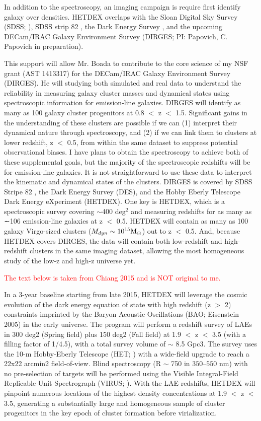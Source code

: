 \documentclass[apj, revtex4]{emulateapj}
\newcommand{\editorial}[1]{\textcolor{red}{#1}}
\begin{document}
In addition to the spectroscopy, an imaging campaign is require first identify galaxy over densities. HETDEX overlaps with the Sloan Digital Sky Survey (SDSS; \citealt{Blanton2001a}), SDSS strip 82 \citep{Annis2014}, the Dark Energy Survey \citep{DES2005}, and the upcoming DECam/IRAC Galaxy Environment Survey (DIRGES; PI: Papovich, C. Papovich \etal in preparation).

This support will allow Mr. Boada to contribute to the core science of my NSF grant (AST 1413317) for the DECam/IRAC Galaxy Environment Survey (DIRGES). He will studying both simulated and real data to understand the reliability in measuring galaxy cluster masses and dynamical states using spectroscopic information for emission-line galaxies. DIRGES will identify as many as 100 galaxy cluster progenitors at 0.8 $<$ z $<$ 1.5. Significant gains in the understanding of these clusters are possible if we can (1) interpret their dynamical nature through spectroscopy, and (2) if we can link them to clusters at lower redshift, z $<$ 0.5, from within the same dataset to suppress potential observational biases. I have plans to obtain the spectroscopy to achieve both of these supplemental goals, but the majority of the spectroscopic redshifts will be for emission-line galaxies. It is not straightforward to use these data to interpret the kinematic and dynamical states of the clusters. DIRGES is covered by SDSS Stripe 82 \citep{Annis2014}, the Dark Energy Survey (DES), and the Hobby Eberly Telescope Dark Energy eXperiment (HETDEX). One key is HETDEX, which is a spectroscopic survey covering $\sim$400 deg$^2$ and measuring redshifts for as many as ∼106 emission-line galaxies at z $<$ 0.5. HETDEX will contain as many as 100 galaxy Virgo-sized clusters ($M_{dyn}\sim10^{15}\hbox{$\mathrm{M}_\odot$}$) out to z $<$ 0.5. And, because HETDEX covers DIRGES, the data will contain both low-redshift and high-redshift clusters in the same imaging dataset, allowing the most homogeneous study of the low-z and high-z universe yet.

\editorial{The text below is taken from Chiang 2015 and is NOT original to me.}

In a 3-year baseline starting from late 2015, HETDEX will leverage the cosmic evolution of the dark energy equation of state with high redshift (z $>$ 2) constraints imprinted by the Baryon Acoustic Oscillations (BAO; Eisenstein 2005) in the early universe. The program will perform a redshift survey of LAEs in 300 deg2 (Spring field) plus 150 deg2 (Fall field) at 1.9 $<$ z $<$ 3.5 (with a filling factor of 1/4.5), with a total survey volume of $\sim$ 8.5 Gpc3. The survey uses the 10-m Hobby-Eberly Telescope (HET; \citealt{Ramsey1998}) with a wide-field upgrade to reach a 22x22 arcmin2 field-of-view. Blind spectroscopy (R $\sim$ 750 in $350–550$ nm) with no pre-selection of targets will be performed using the Visible Integral-Field Replicable Unit Spectrograph (VIRUS; \citealt{Hill2012}). With the LAE redshifts, HETDEX will pinpoint numerous locations of the highest density concentrations at 1.9 $<$ z $<$ 3.5, generating a substantially large and homogeneous sample of cluster progenitors in the key epoch of cluster formation before virialization.
\end{document}
